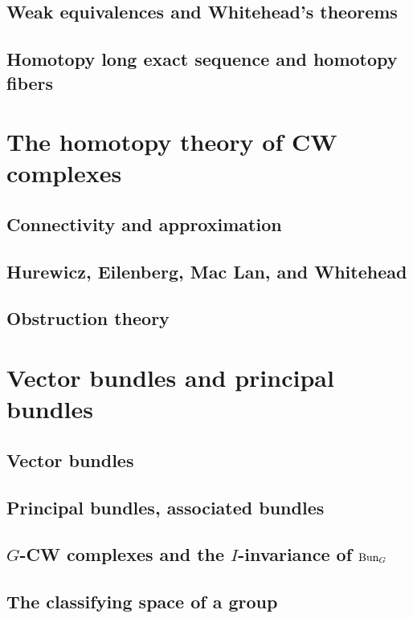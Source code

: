\documentclass[oneside]{amsbook}
\numberwithin{ex}{section}
\begin{document}
\section{Weak equivalences and Whitehead's theorems}

\section{Homotopy long exact sequence and homotopy fibers}


\chapter{The homotopy theory of CW complexes}
\setcounter{section}{48}
\section{Connectivity and approximation}

\setcounter{section}{50}
\section{Hurewicz, Eilenberg, Mac Lan, and Whitehead}

\setcounter{section}{52}
\section{Obstruction theory}


\chapter{Vector bundles and principal bundles}
\section{Vector bundles}

\section{Principal bundles, associated bundles}

\section{$G$-CW complexes and the $I$-invariance of $\operatorname{Bun}_G$}

\section{The classifying space of a group}

\end{document}
